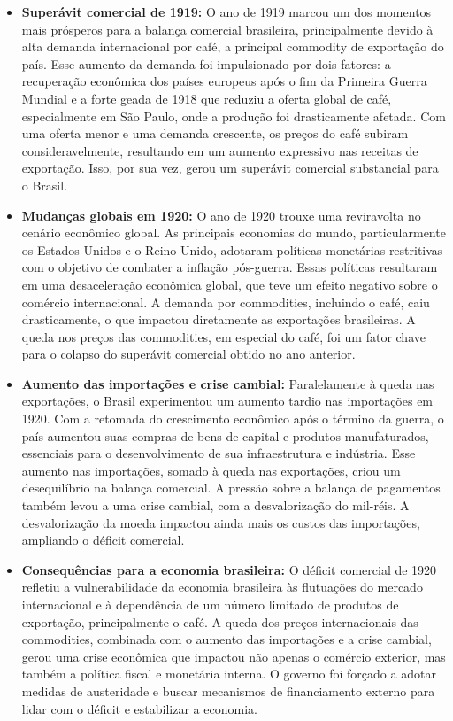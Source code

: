 \documentclass[a4paper,12pt]{article}[abntex2]
\begin{document}
\begin{itemize}
    \item \textbf{Superávit comercial de 1919:} O ano de 1919 marcou um dos momentos mais prósperos para a balança comercial brasileira, principalmente devido à alta demanda internacional por café, a principal commodity de exportação do país. Esse aumento da demanda foi impulsionado por dois fatores: a recuperação econômica dos países europeus após o fim da Primeira Guerra Mundial e a forte geada de 1918 que reduziu a oferta global de café, especialmente em São Paulo, onde a produção foi drasticamente afetada. Com uma oferta menor e uma demanda crescente, os preços do café subiram consideravelmente, resultando em um aumento expressivo nas receitas de exportação. Isso, por sua vez, gerou um superávit comercial substancial para o Brasil.
    
    \item \textbf{Mudanças globais em 1920:} O ano de 1920 trouxe uma reviravolta no cenário econômico global. As principais economias do mundo, particularmente os Estados Unidos e o Reino Unido, adotaram políticas monetárias restritivas com o objetivo de combater a inflação pós-guerra. Essas políticas resultaram em uma desaceleração econômica global, que teve um efeito negativo sobre o comércio internacional. A demanda por commodities, incluindo o café, caiu drasticamente, o que impactou diretamente as exportações brasileiras. A queda nos preços das commodities, em especial do café, foi um fator chave para o colapso do superávit comercial obtido no ano anterior.
    
    \item \textbf{Aumento das importações e crise cambial:} Paralelamente à queda nas exportações, o Brasil experimentou um aumento tardio nas importações em 1920. Com a retomada do crescimento econômico após o término da guerra, o país aumentou suas compras de bens de capital e produtos manufaturados, essenciais para o desenvolvimento de sua infraestrutura e indústria. Esse aumento nas importações, somado à queda nas exportações, criou um desequilíbrio na balança comercial. A pressão sobre a balança de pagamentos também levou a uma crise cambial, com a desvalorização do mil-réis. A desvalorização da moeda impactou ainda mais os custos das importações, ampliando o déficit comercial.
    
    \item \textbf{Consequências para a economia brasileira:} O déficit comercial de 1920 refletiu a vulnerabilidade da economia brasileira às flutuações do mercado internacional e à dependência de um número limitado de produtos de exportação, principalmente o café. A queda dos preços internacionais das commodities, combinada com o aumento das importações e a crise cambial, gerou uma crise econômica que impactou não apenas o comércio exterior, mas também a política fiscal e monetária interna. O governo foi forçado a adotar medidas de austeridade e buscar mecanismos de financiamento externo para lidar com o déficit e estabilizar a economia.
\end{itemize}
\end{document}
